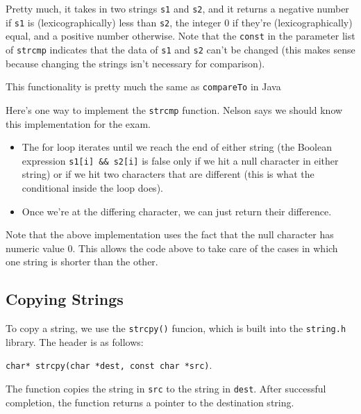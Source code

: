 Pretty much, it takes in two strings \texttt{s1} and \texttt{s2}, and it returns a negative number if \texttt{s1} is (lexicographically) less than \texttt{s2}, the integer $0$ if they're (lexicographically) equal, and a positive number otherwise. Note that the \texttt{const} in the parameter list of \texttt{strcmp} indicates that the data of \texttt{s1} and \texttt{s2} can't be changed (this makes sense because changing the strings isn't necessary for comparison). 


\begin{remark}
This functionality is pretty much the same as  \texttt{compareTo} in Java 
\end{remark}


Here's one way to implement the \texttt{strcmp} function. Nelson says we should know this implementation for the exam. 


\lstset{
caption=String Comparison Implementation
}
\begin{center}
\label{Pointer to a Local Variable}
\end{center}

\begin{itemize}
    \item The for loop iterates until we reach the end of either string (the Boolean expression \verb!s1[i] && s2[i]! is false only if we hit a null character in either string) or if we hit two characters that are different (this is what the conditional inside the loop does).
    \item Once we're at the differing character, we can just return their difference. 
\end{itemize}

Note that the above implementation uses the fact that the null character has numeric value $0$. This allows the code above to take care of the cases in which one string is shorter than the other.  

\subsection{Copying Strings}
To copy a string, we use the \verb!strcpy()! funcion, which is built into the \verb!string.h! library. The header is as follows: \begin{center}
\verb!char* strcpy(char *dest, const char *src)!.
\end{center}

The function copies the string in \verb!src! to the string in \verb!dest!. After successful completion, the function returns a pointer to the destination string. 

